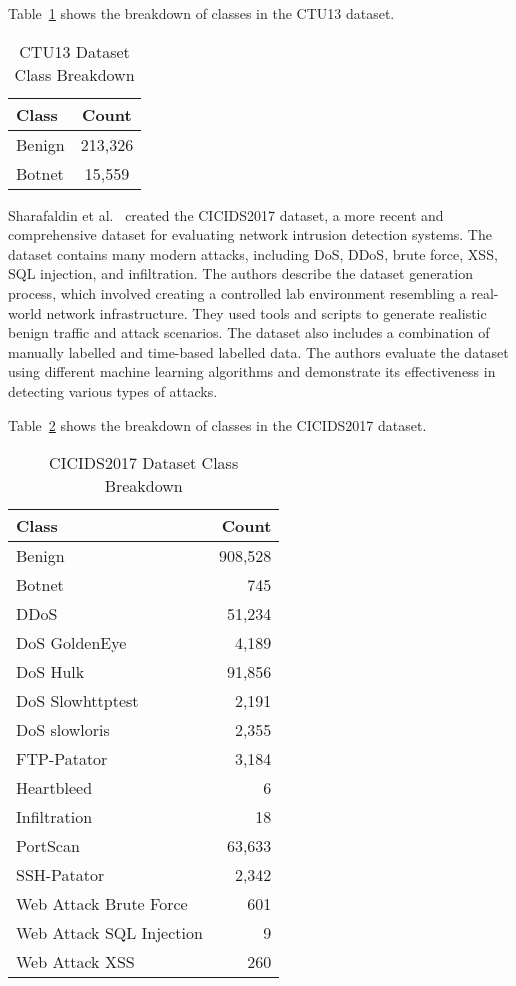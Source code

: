 Table~\ref{tab:ctu13_breakdown} shows the breakdown of classes in the CTU13 dataset.

\begin{table}[ht]
    \centering
    \begin{tabular}{|l|c|} 
    \hline
    \textbf{Class} & \textbf{Count} \\
    \hline
    Benign & 213,326 \\
    \hline
    Botnet & 15,559 \\
    \hline
    \end{tabular}
    \caption{CTU13 Dataset Class Breakdown}\label{tab:ctu13_breakdown}
\end{table}

Sharafaldin et al.~\cite{sharafaldin2018toward} created the CICIDS2017 dataset, a more recent and comprehensive dataset for evaluating network intrusion detection systems. The dataset contains many modern attacks, including DoS, DDoS, brute force, XSS, SQL injection, and infiltration. The authors describe the dataset generation process, which involved creating a controlled lab environment resembling a real-world network infrastructure. They used tools and scripts to generate realistic benign traffic and attack scenarios. The dataset also includes a combination of manually labelled and time-based labelled data. The authors evaluate the dataset using different machine learning algorithms and demonstrate its effectiveness in detecting various types of attacks.

Table~\ref{tab:cicids2017_breakdown} shows the breakdown of classes in the CICIDS2017 dataset.

\begin{table}[ht]
    \centering
    \begin{tabular}{|l|r|} 
    \hline
    \textbf{Class} & \textbf{Count} \\
    \hline
    Benign & 908,528 \\
    Botnet & 745 \\
    DDoS & 51,234 \\
    DoS GoldenEye & 4,189 \\
    DoS Hulk & 91,856 \\
    DoS Slowhttptest & 2,191 \\
    DoS slowloris & 2,355 \\
    FTP-Patator & 3,184 \\
    Heartbleed & 6 \\
    Infiltration & 18 \\
    PortScan & 63,633 \\
    SSH-Patator & 2,342 \\
    Web Attack Brute Force & 601 \\
    Web Attack SQL Injection & 9 \\
    Web Attack XSS & 260 \\
    \hline
    \end{tabular}
    \caption{CICIDS2017 Dataset Class Breakdown}\label{tab:cicids2017_breakdown}
\end{table}

